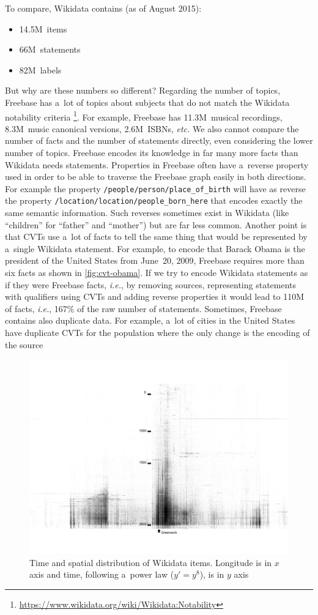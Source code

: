 \documentclass{sig-alternate}
\begin{document}
To compare, Wikidata contains (as of August 2015):

\begin{itemize}
    \setlength\itemsep{0em}
    \item 14.5M~items
    \item 66M~statements
    \item 82M~labels
\end{itemize}

But why are these numbers so different?
Regarding the number of topics, Freebase has a~lot of topics about subjects
that do not match the Wikidata notability criteria%
\footnote{\url{https://www.wikidata.org/wiki/Wikidata:Notability}}.
For example, Freebase has 11.3M~musical recordings, 8.3M~music canonical versions,
2.6M~ISBNs, \emph{etc.}
We also cannot compare the number of facts and the number of statements directly,
even considering the lower number of topics.
Freebase encodes its knowledge in far many more facts than Wikidata needs statements.
Properties in Freebase often have a~reverse property used in order to be able
to traverse the Freebase graph easily in both directions.
For example the property \texttt{/people/person/place\_of\_birth} will have as reverse
the property \texttt{/location/location/people\_born\_here} that encodes
exactly the same semantic information.
Such reverses sometimes exist in Wikidata (like ``children'' for ``father'' and ``mother'')
but are far less common.
Another point is that CVTs use a~lot of facts to tell the same thing that
would be represented by a~single Wikidata statement.
For example, to encode that Barack Obama is the president of the United States from June~20, 2009,
Freebase requires more than six facts as shown in \autoref{fig:cvt-obama}.
If we try to encode Wikidata statements as if they were Freebase facts, \emph{i.e.},
by removing sources, representing statements with qualifiers using CVTs
and adding reverse properties it would lead to 110M of facts,
\emph{i.e.}, 167\% of the raw number of statements.
Sometimes, Freebase contains also duplicate data.
For example, a~lot of cities in the United States have duplicate CVTs for the population
where the only change is the encoding of the source

\begin{figure}[!htbp]
\centering
\includegraphics[width=8.45 cm]{img/wikidata-time-space.png}
\caption{Time and spatial distribution of Wikidata items.
Longitude is in $x$ axis and time, following a~power law ($y' = y^8$), is in $y$ axis}
\label{fig:time-space-wikidata}
\end{figure}
\end{document}
